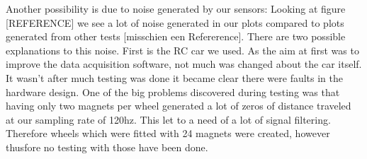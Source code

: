 Another possibility is due to noise generated by our sensors:
Looking at figure [REFERENCE] we see a lot of noise generated in our plots compared to plots generated from other tests [misschien een Refererence]. There are two possible explanations to this noise. First is the RC car we used. As the aim at first was to improve the data acquisition software, not much was changed about the car itself. It wasn’t after much testing was done it became clear there were faults in the hardware design. One of the big problems discovered during testing was that having only two magnets per wheel generated a lot of zeros of distance traveled at our sampling rate of 120hz. This let to a need of a lot of signal filtering. Therefore wheels which were fitted with 24 magnets were created, however thusfore no testing with those have been done.
